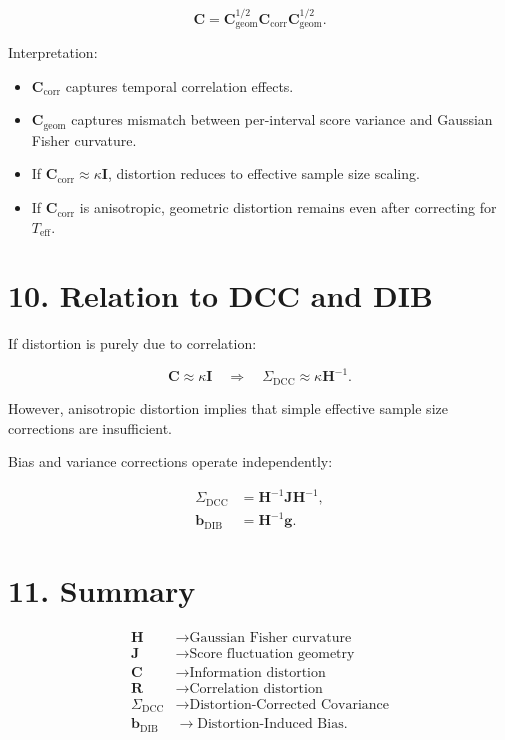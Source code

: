 \documentclass[11pt]{article}
\begin{document}
\begin{equation}
\mathbf C
=
\mathbf C_{\mathrm{geom}}^{1/2}
\mathbf C_{\mathrm{corr}}
\mathbf C_{\mathrm{geom}}^{1/2}.
\end{equation}

Interpretation:

\begin{itemize}
\item $\mathbf C_{\mathrm{corr}}$ captures temporal correlation effects.
\item $\mathbf C_{\mathrm{geom}}$ captures mismatch between per-interval score variance and Gaussian Fisher curvature.
\item If $\mathbf C_{\mathrm{corr}} \approx \kappa \mathbf I$, distortion reduces to effective sample size scaling.
\item If $\mathbf C_{\mathrm{corr}}$ is anisotropic, geometric distortion remains even after correcting for $T_{\mathrm{eff}}$.
\end{itemize}

\section*{10. Relation to DCC and DIB}

If distortion is purely due to correlation:

\begin{equation}
\mathbf C \approx \kappa \mathbf I
\quad \Rightarrow \quad
\Sigma_{\mathrm{DCC}} \approx \kappa \mathbf H^{-1}.
\end{equation}

However, anisotropic distortion implies that
simple effective sample size corrections are insufficient.

Bias and variance corrections operate independently:

\begin{align}
\Sigma_{\mathrm{DCC}} &= \mathbf H^{-1} \mathbf J \mathbf H^{-1}, \\
\mathbf b_{\mathrm{DIB}} &= \mathbf H^{-1} \mathbf g.
\end{align}

\section*{11. Summary}

\begin{align}
\mathbf H &\rightarrow \text{Gaussian Fisher curvature} \\
\mathbf J &\rightarrow \text{Score fluctuation geometry} \\
\mathbf C &\rightarrow \text{Information distortion} \\
\mathbf R &\rightarrow \text{Correlation distortion} \\
\Sigma_{\mathrm{DCC}} &\rightarrow \text{Distortion-Corrected Covariance} \\
\mathbf b_{\mathrm{DIB}} &\rightarrow \text{Distortion-Induced Bias}.
\end{align}
\end{document}
